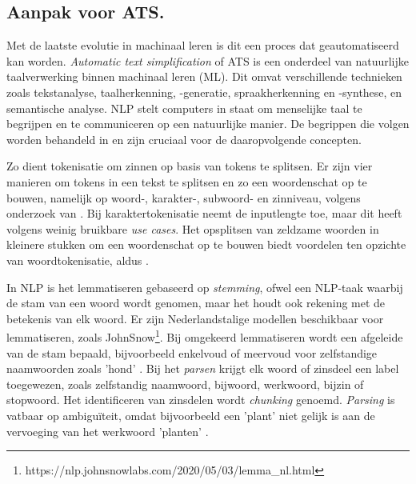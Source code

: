 \subsection{Aanpak voor ATS.}

Met de laatste evolutie in machinaal leren is dit een proces dat geautomatiseerd kan worden. \textit{Automatic text simplification} of ATS is een onderdeel van natuurlijke taalverwerking binnen machinaal leren (ML). Dit omvat verschillende technieken zoals tekstanalyse, taalherkenning, -generatie, spraakherkenning en -synthese, en semantische analyse. NLP stelt computers in staat om menselijke taal te begrijpen en te communiceren op een natuurlijke manier. De begrippen die volgen worden behandeld in \textcite{Sohom2019, Eisenstein2019} en zijn cruciaal voor de daaropvolgende concepten.

\medspace

Zo dient tokenisatie om zinnen op basis van tokens te splitsen. Er zijn vier manieren om tokens in een tekst te splitsen en zo een woordenschat op te bouwen, namelijk op woord-, karakter-, subwoord- en zinniveau, volgens onderzoek van \textcite{Menzli2023}. Bij karaktertokenisatie neemt de inputlengte toe, maar dit heeft volgens \textcite{Ribeiro2018} weinig bruikbare \textit{use cases}. Het opsplitsen van zeldzame woorden in kleinere stukken om een woordenschat op te bouwen biedt voordelen ten opzichte van woordtokenisatie, aldus \autocite{Iredale2022}.

\medspace

In NLP is het lemmatiseren gebaseerd op \textit{stemming}, ofwel een NLP-taak waarbij de stam van een woord wordt genomen, maar het houdt ook rekening met de betekenis van elk woord. Er zijn Nederlandstalige modellen beschikbaar voor lemmatiseren, zoals JohnSnow\footnote{https://nlp.johnsnowlabs.com/2020/05/03/lemma\_nl.html}. Bij omgekeerd lemmatiseren wordt een afgeleide van de stam bepaald, bijvoorbeeld enkelvoud of meervoud voor zelfstandige naamwoorden zoals 'hond' \autocite{Eisenstein2019}. Bij het \textit{parsen} krijgt elk woord of zinsdeel een label toegewezen, zoals zelfstandig naamwoord, bijwoord, werkwoord, bijzin of stopwoord. Het identificeren van zinsdelen wordt \textit{chunking} genoemd. \textit{Parsing} is vatbaar op ambiguïteit, omdat bijvoorbeeld een 'plant' niet gelijk is aan de vervoeging van het werkwoord 'planten' \autocite{Eisenstein2019}.

